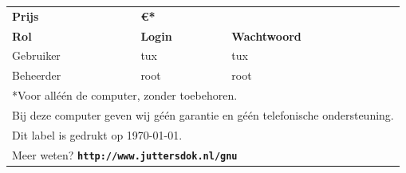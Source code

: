 \documentclass[a4paper,14pt]{extarticle}
\begin{document}
\begin{center}
\begin{tabular}{ p{4cm} p{4cm}l }
	{\LARGE \bf Prijs} & \multicolumn{2}{l}{\LARGE \bf \euro{}{\price{}*}}        \\[1.5em] 
	\textbf{Rol}       & \textbf{Login} & \textbf{Wachtwoord}                     \\
	Gebruiker          & tux            & tux                                     \\
	Beheerder          & root					  & root                                    \\[2em]
	\multicolumn{3}{l}{*Voor all\'e\'en de computer, zonder toebehoren.}          \\
	\multicolumn{3}{l}{Bij deze computer geven wij g\'e\'en garantie en g\'e\'en telefonische ondersteuning.}\\
  \multicolumn{3}{l}{Dit label is gedrukt op \today.}\\[1.5em]
	\multicolumn{3}{l}{Meer weten? \textbf{\texttt{http://www.juttersdok.nl/gnu}}}\\
\end{tabular}
\end{center}
\end{document}
